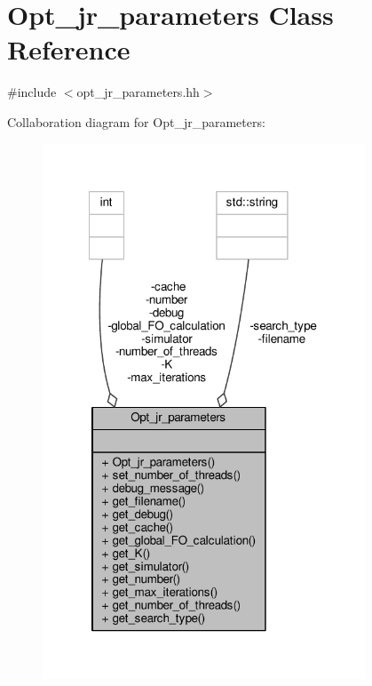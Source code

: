 \hypertarget{classOpt__jr__parameters}{\section{Opt\-\_\-jr\-\_\-parameters Class Reference}
\label{classOpt__jr__parameters}
}


{\ttfamily \#include $<$opt\-\_\-jr\-\_\-parameters.\-hh$>$}



Collaboration diagram for Opt\-\_\-jr\-\_\-parameters\-:
\nopagebreak
\begin{figure}[H]
\begin{center}
\leavevmode
\includegraphics[width=272pt]{classOpt__jr__parameters__coll__graph}
\end{center}
\end{figure}
